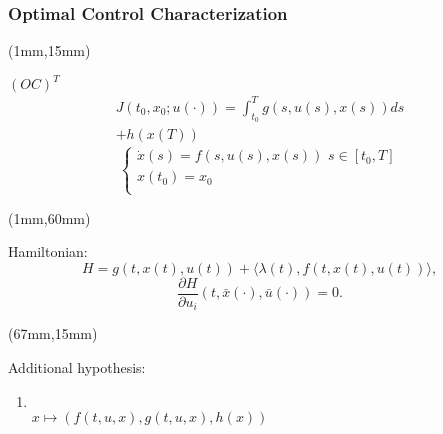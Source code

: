 \begin{frame}[plain]
    \frametitle{Optimal Control Characterization}
    \begin{textblock*}{65mm}(1mm,15mm)
        \begin{yellowbox}{$(OC)^T$}
            \begin{multline*}
                J(t_0,x_0;u(\cdot))
                    = \int_{t_0}^{T} g(s,u(s),x(s)) ds
                    \\
                         + h(x(T))
            \end{multline*}
            $$
                \left\{ 
                    \begin{array}{l}
                        \dot{x}(s)=f(s,u(s),x(s))\,\,s\in [t_0,T]
                        \\
                        x(t_0)=x_0
                        \\
                    \end{array}
                \right.
            $$
        \end{yellowbox}
    \end{textblock*}
%
    \begin{textblock*}{65mm}(1mm,60mm)
        \begin{greenbox}{Hamiltonian:}
            \begin{equation*}
                H=g(t,x(t),u(t))
                    +\langle \lambda(t),f(t,x(t),u(t))\rangle,
            \end{equation*}
        \tcblower
            \begin{equation*}
                \frac{\partial H}{\partial 
                u_i}(t,\bar{x}(\cdot),\bar{u}(\cdot))=0.
            \end{equation*}
        \end{greenbox}
    \end{textblock*}
    \begin{textblock*}{60mm}(67mm,15mm)
        \begin{graybox}{Additional hypothesis:}
            \begin{enumerate}[(\textbf{{C}}-4)]
                \item
                \hspace*{-2mm}
                \\
                $
                    x \mapsto 
                    \left(
                        f(t,u,x),g(t,u,x),h(x)
                    \right)
                $
                \\

\end{enumerate}
\end{graybox}
\end{textblock*}
\end{frame}
